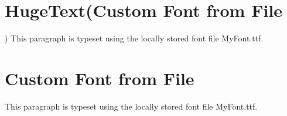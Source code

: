 \documentclass{article}%
\begin{document}
%
\normalsize%
\section*{HugeText(Custom Font from File})%
This paragraph is typeset using the locally stored font file MyFont.ttf.%
\section*{Custom Font from File}%
This paragraph is typeset using the locally stored font file MyFont.ttf.%
\end{document}
